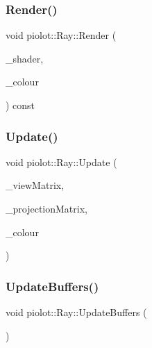 \mbox{\label{classpiolot_1_1_ray_a7ecae233c62860e006b474b293c1e6ca}} 
\subsubsection{\texorpdfstring{Render()}{Render()}}
{\footnotesize\ttfamily void piolot\+::\+Ray\+::\+Render (\begin{DoxyParamCaption}\item[{std\+::shared\+\_\+ptr$<$ \mbox{\hyperlink{classpiolot_1_1_g_l_shader}{G\+L\+Shader}} $>$}]{\+\_\+shader,  }\item[{glm\+::vec3}]{\+\_\+colour }\end{DoxyParamCaption}) const}

\mbox{\label{classpiolot_1_1_ray_ada7c74126da4e4c8c0c7a63ae36c1ced}} 
\subsubsection{\texorpdfstring{Update()}{Update()}}
{\footnotesize\ttfamily void piolot\+::\+Ray\+::\+Update (\begin{DoxyParamCaption}\item[{const glm\+::mat4}]{\+\_\+view\+Matrix,  }\item[{const glm\+::mat4}]{\+\_\+projection\+Matrix,  }\item[{const glm\+::vec3}]{\+\_\+colour }\end{DoxyParamCaption})}

\mbox{\label{classpiolot_1_1_ray_a6c21a81fd81741cca7f823e87fed1aef}} 
\subsubsection{\texorpdfstring{Update\+Buffers()}{UpdateBuffers()}}
{\footnotesize\ttfamily void piolot\+::\+Ray\+::\+Update\+Buffers (\begin{DoxyParamCaption}{ }\end{DoxyParamCaption})\hspace{0.3cm}{\ttfamily [private]}}




